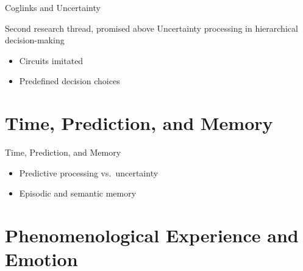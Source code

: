 \documentclass[aspectratio=169]{beamer}
\begin{document}
\begin{frame}{Coglinks and Uncertainty}
  \begin{block}{Second research thread, promised above}
    Uncertainty processing in hierarchical decision-making \parencite{wang2025neural}
  \end{block}

  \pause
  \vspace{1em}
  \begin{itemize}
    \item Circuits imitated
    \item Predefined decision choices
  \end{itemize}

\end{frame}

\section{Time, Prediction, and Memory}

\begin{frame}{Time, Prediction, and Memory}
  \begin{itemize}
    \item Predictive processing vs.\ uncertainty
    \item Episodic and semantic memory
  \end{itemize}
\end{frame}

\section{Phenomenological Experience and Emotion}
\end{document}
